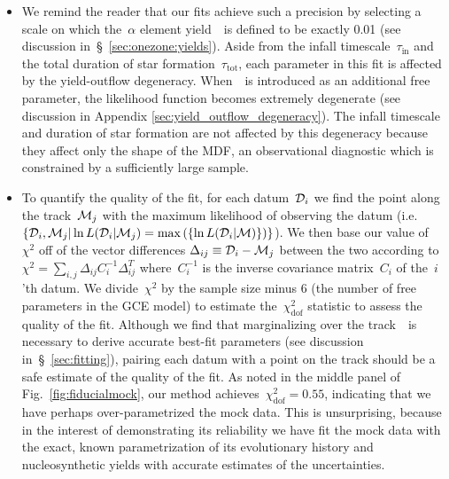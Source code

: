 \documentclass[ms.tex]{subfiles}
\begin{document}
\begin{itemize}

	\item We remind the reader that our fits achieve such a precision by
	selecting a scale on which the~$\alpha$ element yield~\yacc~is defined to
	be exactly 0.01 (see discussion in~\S~\ref{sec:onezone:yields}).
	Aside from the infall timescale~$\tau_\text{in}$ and the total duration of
	star formation~$\tau_\text{tot}$, each parameter in this fit is affected by
	the yield-outflow degeneracy.
	When~\yacc~is introduced as an additional free parameter, the likelihood
	function becomes extremely degenerate (see discussion in Appendix
	\ref{sec:yield_outflow_degeneracy}).
	The infall timescale and duration of star formation are not affected by
	this degeneracy because they affect only the shape of the MDF, an
	observational diagnostic which is constrained by a sufficiently large
	sample.

	\item To quantify the quality of the fit, for each datum~$\mathcal{D}_i$
	we find the point along the track~$\mathcal{M}_j$ with the maximum
	likelihood of observing the datum (i.e.~$\{\mathcal{D}_i, \mathcal{M}_j |
	\ln L(\mathcal{D}_i | \mathcal{M}_j) = \max\left(\{
	\ln L(\mathcal{D}_i | \mathcal{M})\}\right)\}$).
	We then base our value of~$\chi^2$ off of the vector differences
	$\Delta_{ij} \equiv \mathcal{D}_i - \mathcal{M}_j$ between the two according
	to $\chi^2 = \sum_{i,j} \Delta_{ij}C_i^{-1}\Delta_{ij}^T$ where~$C_i^{-1}$
	is the inverse covariance matrix~$C_i$ of the~$i$'th datum.
	We divide~$\chi^2$ by the sample size minus 6 (the number of free
	parameters in the GCE model) to estimate the~$\chi^2_\text{dof}$ statistic
	to assess the quality of the fit.
	Although we find that marginalizing over the track~~is necessary
	to derive accurate best-fit parameters (see discussion
	in~\S~\ref{sec:fitting}), pairing each datum with a point on the track
	should be a safe estimate of the quality of the fit.
	As noted in the middle panel of Fig.~\ref{fig:fiducialmock}, our method
	achieves~$\chi_\text{dof}^2 = 0.55$, indicating that we have perhaps
	over-parametrized the mock data.
	This is unsurprising, because in the interest of demonstrating its
	reliability we have fit the mock data with the exact, known parametrization
	of its evolutionary history and nucleosynthetic yields with accurate
	estimates of the uncertainties.


\end{itemize}
\end{document}
